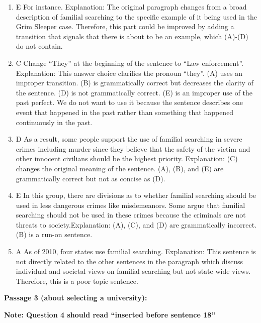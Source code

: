 \begin{enumerate}
\item E For instance. Explanation: The original paragraph changes from a broad description of familial searching to the specific example of it being used in the Grim Sleeper case. Therefore, this part could be improved by adding a transition that signals that there is about to be an example, which (A)-(D) do not contain. 
\item C Change ``They'' at the beginning of the sentence to ``Law enforcement''. Explanation: This answer choice clarifies the pronoun ``they''. (A) uses an improper transition. (B) is grammatically correct but decreases the clarity of the sentence. (D) is not grammatically correct. (E) is an improper use of the past perfect. We do not want to use it because the sentence describes one event that happened in the past rather than something that happened continuously in the past. 
\item D As a result, some people support the use of familial searching in severe crimes including murder since they believe that the safety of the victim and other innocent civilians should be the highest priority. Explanation: (C) changes the original meaning of the sentence. (A), (B), and (E) are grammatically correct but not as concise as (D).
\item E In this group, there are divisions as to whether familial searching should be used in less dangerous crimes like misdemeanors. Some argue that familial searching should not be used in these crimes because the criminals are not threats to society.Explanation: (A), (C), and (D) are grammatically incorrect. (B) is a run-on sentence. 
\item A As of 2010, four states use familial searching. Explanation: This sentence is not directly related to the other sentences in the paragraph which discuss individual and societal views on familial searching but not state-wide views. Therefore, this is a poor topic sentence. 
\end{enumerate}

\textbf{Passage 3 (about selecting a university):}

\bigskip
\textbf{Note: Question 4 should read ``inserted before sentence 18''}


